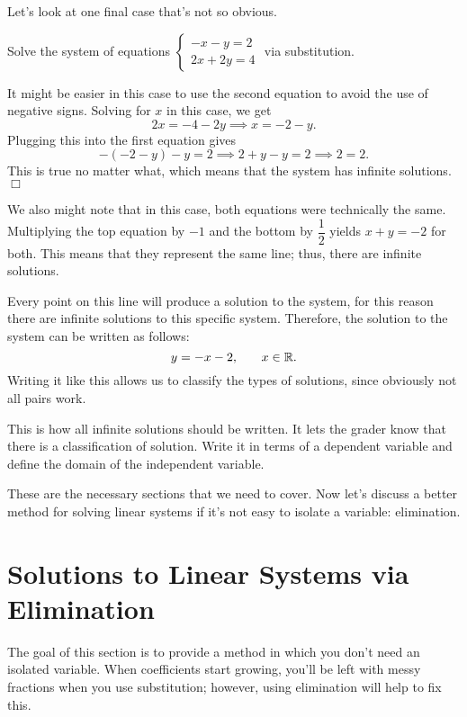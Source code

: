 \documentclass[lang=en,11pt]{elegantbook}
\begin{document}
Let's look at one final case that's not so obvious.
\begin{example}
Solve the system of equations $\begin{cases} -x-y=2 \\ 2x+2y=4 \end{cases}$ via substitution.
\end{example}
\begin{solution}
It might be easier in this case to use the second equation to avoid the use of negative signs.  Solving for $x$ in this case, we get $$2x=-4-2y \implies x=-2-y.$$  Plugging this into the first equation gives $$-(-2-y)-y=2 \implies 2+y-y=2 \implies 2=2.$$  This is true no matter what, which means that the system has infinite solutions.  $\Box$
\end{solution}
We also might note that in this case, both equations were technically the same.  Multiplying the top equation by $-1$ and the bottom by $\dfrac{1}{2}$ yields $x+y=-2$ for both.  This means that they represent the same line; thus, there are infinite solutions.

Every point on this line will produce a solution to the system, for this reason there are infinite solutions to this specific system.  Therefore, the solution to the system can be written as follows: $$y=-x-2, \hspace{0.25in} x\in\mathbb{R}.$$  Writing it like this allows us to classify the types of solutions, since obviously not all pairs work.

\begin{remark}
This is how all infinite solutions should be written.  It lets the grader know that there is a classification of solution.  Write it in terms of a dependent variable and define the domain of the independent variable.
\end{remark}

These are the necessary sections that we need to cover.  Now let's discuss a better method for solving linear systems if it's not easy to isolate a variable: elimination.
\section{Solutions to Linear Systems via Elimination}
\noindent The goal of this section is to provide a method in which you don't need an isolated variable.  When coefficients start growing, you'll be left with messy fractions when you use substitution; however, using elimination will help to fix this.
\end{document}
